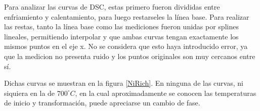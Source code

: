 \documentclass[12pt]{article}
\theoremstyle{definition}
\theoremstyle{remark}
\begin{document}
Para analizar las curvas de DSC, estas primero fueron divididas entre enfriamiento y calentamiento, para luego restarseles la línea base. Para realizar las restas, tanto la línea base como las mediciones fueron unidas por splines lineales, permitiendo interpolar y que ambas curvas tengan exactamente los mismos puntos en el eje x. No se considera que esto haya introducido error, ya que la medicion no presenta ruido y los puntos originales son muy cercanos entre sí.

Dichas curvas se muestran en la figura \ref{NiRich}. En ninguna de las curvas, ni siquiera en la de $700 ^\circ C$, en la cual aproximadamente se conocen las temperaturas de inicio y transformación, puede apreciarse un cambio de fase.

\begin{figure}[H]
\noindent{}\\
\noindent{}
\end{figure}
\end{document}
